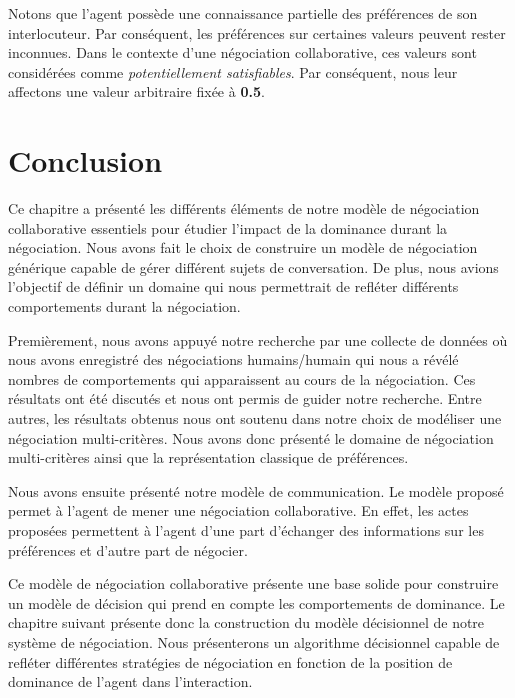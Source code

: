 				Notons que l'agent possède une connaissance partielle des préférences de son interlocuteur. Par conséquent, les préférences sur certaines valeurs peuvent rester inconnues. Dans  le contexte d'une négociation collaborative, ces valeurs sont considérées comme \textit{potentiellement satisfiables}. Par conséquent, nous leur affectons une valeur arbitraire fixée à \textbf{0.5}.
				
	\section{Conclusion}
			Ce chapitre a présenté les différents éléments de notre modèle de négociation collaborative essentiels pour étudier l'impact de la dominance durant la négociation. Nous avons fait le choix de construire un modèle de négociation générique capable de gérer différent sujets de conversation. De plus, nous avions l'objectif de définir un domaine qui nous permettrait de refléter différents comportements durant la négociation. 
			
			Premièrement, nous avons appuyé notre recherche par une collecte de données où nous avons enregistré des négociations humains/humain qui nous a révélé nombres de comportements qui apparaissent au cours de la négociation. Ces résultats ont été discutés et nous ont permis de guider notre recherche. Entre autres, les résultats obtenus nous ont soutenu dans notre choix de modéliser une négociation  multi-critères.
			Nous avons donc présenté le domaine de négociation multi-critères ainsi que la représentation classique de préférences.
			
			Nous avons ensuite présenté notre modèle de communication. Le modèle proposé permet à l'agent de mener une négociation collaborative. En effet, les actes proposées permettent à l'agent d'une part d'échanger des informations sur les préférences et d'autre part de négocier. 
			
			Ce modèle de négociation collaborative présente une base solide pour construire un modèle de décision qui prend en compte les comportements de dominance. Le chapitre suivant présente donc la construction du modèle décisionnel de notre système de négociation. Nous présenterons un algorithme décisionnel capable de refléter différentes stratégies de négociation en fonction de la position de dominance de l'agent dans l'interaction.
					
			
	
